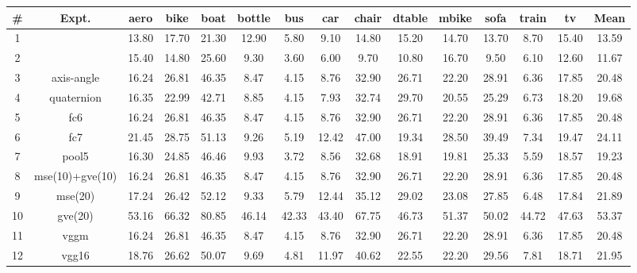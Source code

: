 \documentclass[10pt,twocolumn,letterpaper]{article}
\begin{document}
	\begin{table*}[h!]
	\small
	\setlength{\tabcolsep}{1.75mm}
	\centering
	\begin{tabular}{|c|@{\;}c@{\;}|cccccccccccc|c|}
		\hline
		\# & Expt. & aero & bike & boat & bottle & bus & car & chair & dtable & mbike & sofa & train & tv & Mean \\
		\hline
		
		1 & \cite{Tulsiani:CVPR15} & 13.80 & 17.70 & 21.30 & 12.90 & 5.80 & 9.10 & 14.80 & 15.20 & 14.70 & 13.70 & 8.70 & 15.40 & 13.59 \\ 
		2 & \cite{Su:ICCV15} & 15.40 & 14.80 & 25.60 & 9.30 & 3.60 & 6.00 & 9.70 & 10.80 & 16.70 & 9.50 & 6.10 & 12.60 & 11.67 \\ 
		\hline

		3 & axis-angle & 16.24 & 26.81 & 46.35 & 8.47 & 4.15 & 8.76 & 32.90 & 26.71 & 22.20 & 28.91 & 6.36 & 17.85 & 20.48 \\ 
		4 & quaternion & 16.35 & 22.99 & 42.71 & 8.85 & 4.15 & 7.93 & 32.74 & 29.70 & 20.55 & 25.29 & 6.73 & 18.20 & 19.68 \\ 
		\hline

		5 & fc6 & 16.24 & 26.81 & 46.35 & 8.47 & 4.15 & 8.76 & 32.90 & 26.71 & 22.20 & 28.91 & 
		6.36 & 17.85 & 20.48 \\ 
		6 & fc7 & 21.45 & 28.75 & 51.13 & 9.26 & 5.19 & 12.42 & 47.00 & 19.34 & 28.50 & 39.49 
		& 7.34 & 19.47 & 24.11 \\ 
		7 & pool5 & 16.30 & 24.85 & 46.46 & 9.93 & 3.72 & 8.56 & 32.68 & 18.91 & 19.81 & 25.33 & 5.59 & 18.57 & 19.23 \\ 
		\hline

		8 & mse(10)+gve(10) & 16.24 & 26.81 & 46.35 & 8.47 & 4.15 & 8.76 & 32.90 & 26.71 & 22.20 & 28.91 & 6.36 & 17.85 & 20.48 \\ 
		9 & mse(20) & 17.24 & 26.42 & 52.12 & 9.33 & 5.79 & 12.44 & 35.12 & 29.02 & 23.08 & 27.85 & 6.48 & 17.84 & 21.89 \\ 
		10 & gve(20) & 53.16 & 66.32 & 80.85 & 46.14 & 42.33 & 43.40 & 67.75 & 46.73 & 51.37 & 50.02 & 44.72 & 47.63 & 53.37 \\ 
		\hline
		
		11 & vggm & 16.24 & 26.81 & 46.35 & 8.47 & 4.15 & 8.76 & 32.90 & 26.71 & 22.20 & 
		28.91 & 6.36 & 17.85 & 20.48 \\ 
		12 & vgg16 & 18.76 & 26.62 & 50.07 & 9.69 & 4.81 & 11.97 & 40.62 & 22.55 & 22.20 & 
		29.56 & 7.81 & 18.71 & 21.95 \\ 
		\hline


\end{tabular}
\end{table*}
\end{document}
